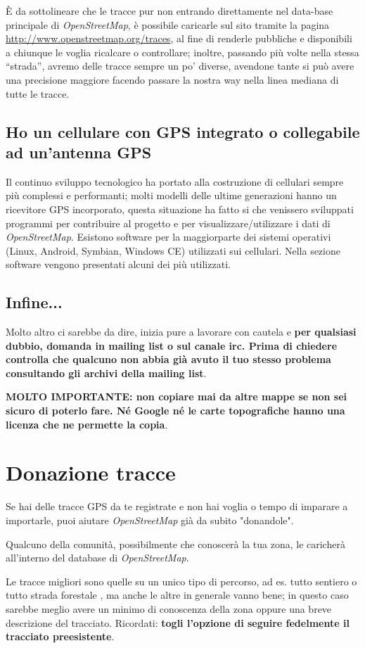 \documentclass[a4paper,twoside,12pt,]{article}
\newcommand{\osm}{\emph{OpenStreetMap}\xspace}
\newcommand{\gps}{GPS\xspace}
\begin{document}
È da sottolineare che le tracce pur non entrando direttamente nel data-base principale di \osm, è possibile caricarle sul sito tramite la pagina \url{http://www.openstreetmap.org/traces}, al fine di renderle pubbliche e disponibili a chiunque le voglia ricalcare o controllare; inoltre, passando più volte nella stessa ``strada'', avremo delle tracce sempre un po' diverse, avendone tante si può avere una precisione maggiore facendo passare la nostra way nella linea mediana di tutte le tracce.
\subsection{Ho un cellulare con \gps integrato o collegabile ad un'antenna \gps}
Il continuo sviluppo tecnologico ha portato alla costruzione di cellulari sempre più complessi e performanti; molti modelli delle ultime generazioni hanno un ricevitore \gps incorporato, questa situazione ha fatto si che venissero sviluppati programmi per contribuire al progetto e per visualizzare/utilizzare i dati di \osm. Esistono software per la maggiorparte dei sistemi operativi (Linux, Android, Symbian, Windows CE) utilizzati sui cellulari. Nella sezione software vengono presentati alcuni dei più utilizzati.

\subsection{Infine...}
Molto altro ci sarebbe da dire, inizia pure a lavorare con cautela e \textbf{per qualsiasi dubbio, domanda in mailing list o sul canale irc. Prima di chiedere controlla che qualcuno non abbia già avuto il tuo stesso problema consultando gli archivi della mailing list}.

\textbf{MOLTO IMPORTANTE: non copiare mai da altre mappe se non sei sicuro di poterlo fare. Né Google né le carte topografiche hanno una licenza che ne permette la copia}.

\section{Donazione tracce}
Se hai delle tracce \gps da te registrate e non hai voglia o tempo di imparare a importarle, puoi aiutare \osm già da subito "donandole".

Qualcuno della comunità, possibilmente che conoscerà la tua zona, le caricherà all'interno del database di \osm.

Le tracce migliori sono quelle su un unico tipo di percorso, ad es. tutto sentiero o tutto strada forestale , ma anche le altre in generale vanno bene; in questo caso sarebbe meglio avere un minimo di conoscenza della zona oppure una breve descrizione del tracciato. Ricordati: \textbf{togli l'opzione di seguire fedelmente il tracciato preesistente}.
\end{document}
